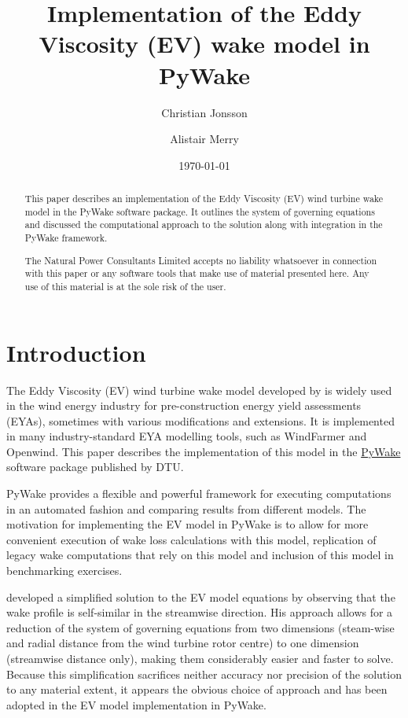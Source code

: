 \documentclass[11pt,a4paper]{article}
\title{Implementation of the Eddy Viscosity (EV) wake model in PyWake}
\author{Christian Jonsson}
\author{Alistair Merry}
\affil{The Natural Power Consultants Limited}
\date{\today}
\begin{document}
\maketitle

\begin{abstract}
This paper describes an implementation of the Eddy Viscosity (EV) wind turbine wake model in the PyWake software package. It outlines the system of governing equations and discussed the computational approach to the solution along with integration in the PyWake framework.
\end{abstract}

\renewcommand\abstractname{Disclaimer}
\begin{abstract}
The Natural Power Consultants Limited accepts no liability whatsoever in connection with this paper or any software tools that make use of material presented here. Any use of this material is at the sole risk of the user.
\end{abstract}

\section{Introduction}\label{introduction}

The Eddy Viscosity (EV) wind turbine wake model developed by \textcite{Ainslie_1988} is widely used in the wind energy industry for pre-construction energy yield assessments (EYAs), sometimes with various modifications and extensions. It is implemented in many industry-standard EYA modelling tools, such as WindFarmer and Openwind. This paper describes the implementation of this model in the \href{https://gitlab.windenergy.dtu.dk/TOPFARM/PyWake}{PyWake} software package published by DTU.

PyWake provides a flexible and powerful framework for executing computations in an automated fashion and comparing results from different models. The motivation for implementing the EV model in PyWake is to allow for more convenient execution of wake loss calculations with this model, replication of legacy wake computations that rely on this model and inclusion of this model in benchmarking exercises.

\textcite{Anderson_2011} developed a simplified solution to the EV model equations by observing that the wake profile is self-similar in the streamwise direction. His approach allows for a reduction of the system of governing equations from two dimensions (steam-wise and radial distance from the wind turbine rotor centre) to one dimension (streamwise distance only), making them considerably easier and faster to solve. Because this simplification sacrifices neither accuracy nor precision of the solution to any material extent, it appears the obvious choice of approach and has been adopted in the EV model implementation in PyWake.
\end{document}
